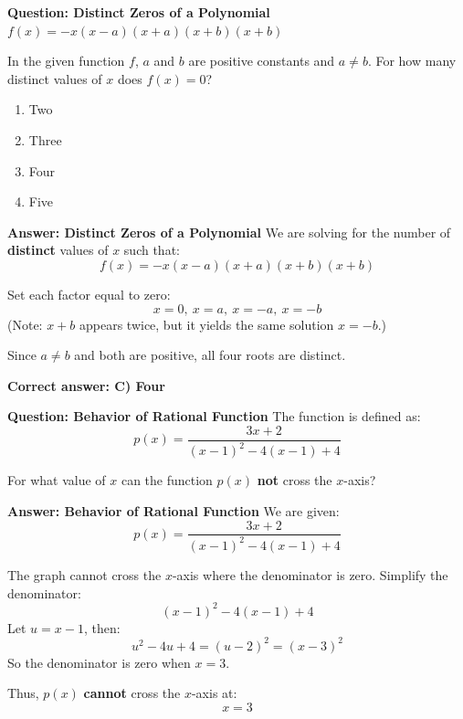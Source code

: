 \documentclass{beamer}
\begin{document}
\begin{frame}{\textbf{Question: Distinct Zeros of a Polynomial}}
$f(x) = -x(x - a)(x + a)(x + b)(x + b)$

In the given function $f$, $a$ and $b$ are positive constants and $a \ne b$.  
For how many distinct values of $x$ does $f(x) = 0$?
\vspace{1em}

\begin{enumerate}
\item[A] Two
\item[B] Three
\item[C] Four
\item[D] Five
\end{enumerate}
\end{frame}

\begin{frame}{\textbf{Answer: Distinct Zeros of a Polynomial}}
We are solving for the number of \textbf{distinct} values of $x$ such that:
\[
f(x) = -x(x - a)(x + a)(x + b)(x + b)
\]

Set each factor equal to zero:
\[
x = 0,\ x = a,\ x = -a,\ x = -b
\]
(Note: $x + b$ appears twice, but it yields the same solution $x = -b$.)

Since $a \ne b$ and both are positive, all four roots are distinct.

\bigskip
\textbf{Correct answer: C) Four}
\end{frame}


\begin{frame}{\textbf{Question: Behavior of Rational Function}}
The function is defined as:
\[
p(x) = \frac{3x + 2}{(x - 1)^2 - 4(x - 1) + 4}
\]

For what value of $x$ can the function $p(x)$ \textbf{not} cross the $x$-axis?
\end{frame}


\begin{frame}{\textbf{Answer: Behavior of Rational Function}}
We are given:
\[
p(x) = \frac{3x + 2}{(x - 1)^2 - 4(x - 1) + 4}
\]

The graph cannot cross the $x$-axis where the denominator is zero. Simplify the denominator:
\[
(x - 1)^2 - 4(x - 1) + 4
\]
Let $u = x - 1$, then:
\[
u^2 - 4u + 4 = (u - 2)^2 = (x - 3)^2
\]
So the denominator is zero when $x = 3$.

Thus, $p(x)$ \textbf{cannot} cross the $x$-axis at:
\[
\boxed{x = 3}
\]
\end{frame}
\end{document}
